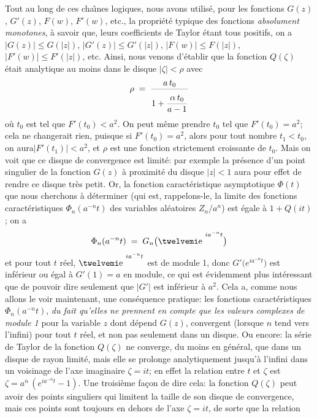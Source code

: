 \bigskip
Tout au long de ces cha{\^\i}nes logiques, nous avons utilis\'e, pour les
fonctions $G(z)$, $G'(z)$, $F(w)$, $F'(w)$, etc., la propri\'et\'e typique 
des fonctions {\it absolument monotones}, \`a savoir que, leurs
coefficients de Taylor \'etant tous positifs, on a $|G(z)| \leq G(|z|)$,
$|G'(z)| \leq  G'(|z|)$, $|F(w)| \leq F(|z|)$, $|F'(w)| \leq F'(|z|)$, etc.
\medskip
Ainsi, nous venons d'\'etablir que la fonction $Q(\zeta )$ \'etait 
analytique au moins dans le disque $|\zeta | < \rho$ avec
$$\rho \; = \; {a\, t_0 \over \sdown{19}{\displaystyle 1 + {\alpha\, 
t_0 \over a-1}}}$$
o\`u $t_0$ est tel que $F'(t_0) < a^2$.  On peut m\^eme prendre $t_0$
tel que $F'(t_0) = a^2$;  cela ne changerait rien,  puisque si
$F'(t_0) = a^2$,  alors pour tout nombre
$t_1 < t_0$,  on aura$|F'(t_1)| < a^2$,  et $\rho$ est une fonction strictement croissante de $t_0$.
Mais on voit que ce disque de convergence est limit\'e:  par exemple la
pr\'esence d'un point singulier de la fonction $G(z)$ \`a proximit\'e
du disque $|z| < 1$ aura pour effet de rendre ce disque tr\`es petit.
\medskip
Or, la fonction caract\'eristique asymptotique $\Phi (t)$ que nous 
cherchons \`a d\'eterminer (qui est, rappelons-le, la limite des fonctions
caract\'eristiques $\Phi_n (a^{-n}t)$ des variables al\'eatoires $Z_n /
a^n$) est \'egale \`a $1 + Q(it)$; on a 
$$\Phi_n (a^{-n}t) \; = \; G_n \bigl( \e^{ia^{-n}t} \bigr)$$
et pour tout $t$ r\'eel, $\e^{ia^{-n}t}$ est de module 1, donc $G' \bigl(
e^{ia^{-n}t} \bigr)$ est inf\'erieur ou \'egal \`a $G'(1) = a$ en module, ce
qui est \'evidemment plus int\'eressant que de pouvoir dire seulement 
que $|G'|$  est inf\'erieur \`a $a^2$. Cela a, comme nous allons le voir
maintenant,  une cons\'equence pratique: les fonctions caract\'eristiques
$\Phi_n (a^{-n}t)$, {\it du fait qu'elles ne prennent en compte que les 
valeurs complexes de module 1} pour la variable $z$ dont d\'epend $G(z)$,
convergent (lorsque  $n$ tend vers l'infini) pour tout $t$ r\'eel, et  non pas
seulement dans un disque. Ou encore: la s\'erie de Taylor de la fonction
$Q(\zeta )$ ne converge, du moins en g\'en\'eral, que dans un disque de
rayon limit\'e, mais  elle se prolonge analytiquement jusqu'\`a l'infini
dans un voisinage  de l'axe imaginaire $\zeta = it$; en effet la relation
entre $t$ et $\zeta$ est $\zeta = a^n\, (e^{ia^{-n}t} - 1)$.  Une troisi\`eme
fa\c{c}on de dire cela:  la fonction $Q(\zeta )$ peut avoir des points
singuliers qui limitent la taille de son disque de convergence,  mais ces
points sont toujours en dehors de l'axe $\zeta = it$,  de sorte que la
relation  
